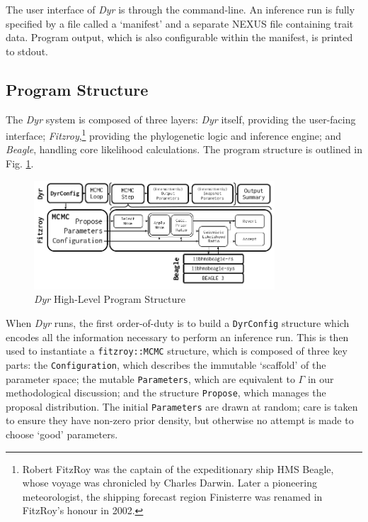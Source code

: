 \documentclass[10pt,journal,compsoc]{IEEEtran}
\begin{document}
The user interface of \textit{Dyr} is through the command-line. An inference run is fully specified by a file called a `manifest' and a separate NEXUS file containing trait data. Program output, which is also configurable within the manifest, is printed to stdout.

\subsection{Program Structure}

The \textit{Dyr} system is composed of three layers: \textit{Dyr} itself, providing the user-facing interface; \textit{Fitzroy},\footnote{Robert FitzRoy was the captain of the expeditionary ship HMS Beagle, whose voyage was chronicled by Charles Darwin. Later a pioneering meteorologist, the shipping forecast region Finisterre was renamed in FitzRoy's honour in 2002.} providing the phylogenetic logic and inference engine; and \textit{Beagle}, handling core likelihood calculations. The program structure is outlined in Fig. \ref{fig:program}.

\begin{figure}
\caption{\textit{Dyr} High-Level Program Structure}\label{fig:program}
\vspace{0.2cm}
\includegraphics[width=9cm,center]{progdiagram}
\end{figure}

When \textit{Dyr} runs, the first order-of-duty is to build a \texttt{DyrConfig} structure which encodes all the information necessary to perform an inference run. This is then used to instantiate a \texttt{fitzroy::MCMC} structure, which is composed of three key parts: the \texttt{Configuration}, which describes the immutable `scaffold' of the parameter space; the mutable \texttt{Parameters}, which are equivalent to $\Gamma$ in our methodological discussion; and the structure \texttt{Propose}, which manages the proposal distribution. The initial \texttt{Parameters} are drawn at random; care is taken to ensure they have non-zero prior density, but otherwise no attempt is made to choose `good' parameters.
\end{document}
